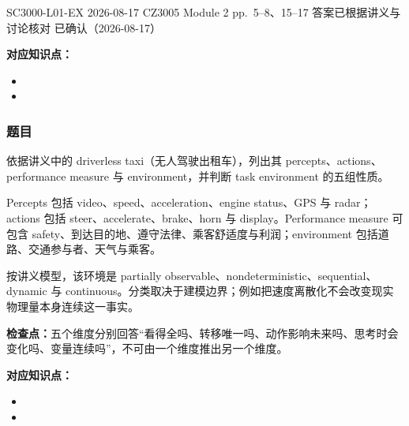 

\examplemeta
  {SC3000-L01-EX}
  {2026-08-17}
  {CZ3005 Module 2 pp.~5--8、15--17}
  {答案已根据讲义与讨论核对}
  {已确认（2026-08-17）}


\textbf{对应知识点：}
\begin{itemize}
  \item {}
  \item {}
\end{itemize}

\subsubsection*{题目}

依据讲义中的 driverless taxi（无人驾驶出租车），列出其 percepts、actions、performance measure 与 environment，并判断 task environment 的五组性质。

\begin{checkedsolution}
Percepts 包括 video、speed、acceleration、engine status、GPS 与 radar；actions 包括 steer、accelerate、brake、horn 与 display。Performance measure 可包含 safety、到达目的地、遵守法律、乘客舒适度与利润；environment 包括道路、交通参与者、天气与乘客。

按讲义模型，该环境是 partially observable、nondeterministic、sequential、dynamic 与 continuous。分类取决于建模边界；例如把速度离散化不会改变现实物理量本身连续这一事实。
\end{checkedsolution}

\textbf{检查点：}五个维度分别回答“看得全吗、转移唯一吗、动作影响未来吗、思考时会变化吗、变量连续吗”，不可由一个维度推出另一个维度。

\clearpage
{}

\textbf{对应知识点：}
\begin{itemize}
  \item {}
  \item {}
\end{itemize}

